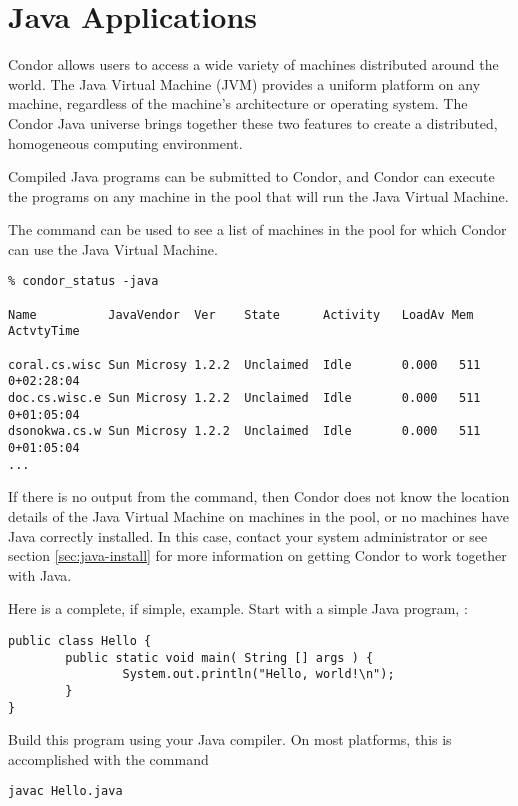 
\section{\label{sec:Java}Java Applications}

Condor allows users to access a wide variety of
machines distributed around the world.
The Java Virtual Machine (JVM)
provides a uniform platform on any machine, regardless of the
machine's architecture or operating system.
The Condor Java universe brings together these
two features to create a distributed, homogeneous computing environment.

Compiled Java programs can be submitted to Condor, and Condor
can execute the programs on any machine in the pool that will run
the Java Virtual Machine.

The  command can be used to see a list of
machines in the pool for which Condor can use the Java Virtual
Machine.

\begin{verbatim}
% condor_status -java

Name          JavaVendor  Ver    State      Activity   LoadAv Mem   ActvtyTime

coral.cs.wisc Sun Microsy 1.2.2  Unclaimed  Idle       0.000   511  0+02:28:04
doc.cs.wisc.e Sun Microsy 1.2.2  Unclaimed  Idle       0.000   511  0+01:05:04
dsonokwa.cs.w Sun Microsy 1.2.2  Unclaimed  Idle       0.000   511  0+01:05:04
...
\end{verbatim}

If there is no output from the
 command,
then Condor does not know the location details of the Java Virtual
Machine on machines in the pool,
or no machines have Java correctly installed.
In this case,
contact your system administrator or see section \ref{sec:java-install}
for more information on getting Condor to work together
with Java.

Here is a complete, if simple, example.
Start with a simple Java program, :

\begin{verbatim}
public class Hello {
        public static void main( String [] args ) {
                System.out.println("Hello, world!\n");
        }
}
\end{verbatim}

Build this program using your Java compiler.
On most platforms, this is
accomplished with the command
\begin{verbatim}
javac Hello.java
\end{verbatim}

